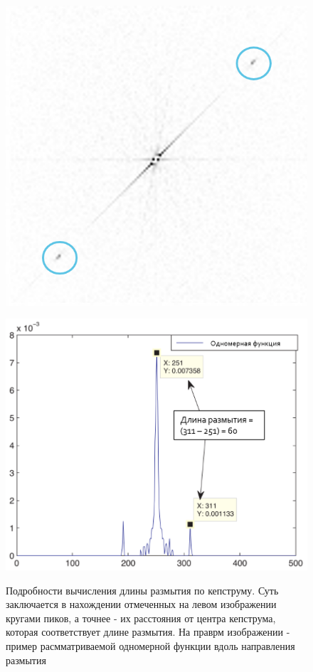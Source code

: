 \begin{figure}[H]
\begin{minipage}[h]{0.45\linewidth}
\includegraphics[width=1\linewidth, right]{pics/len/cep_inverted.png} \\ 
\end{minipage}
\hfill
\begin{minipage}[h]{0.45\linewidth}
\includegraphics[width=1\linewidth, left]{pics/len/oned.PNG} \\ 
\end{minipage}
 
\caption{Подробности вычисления длины размытия по кепструму. Суть заключается в нахождении отмеченных на левом изображении кругами пиков, а точнее - их расстояния от центра кепструма, которая соответствует длине размытия. На праврм изображении - пример расмматриваемой одномерной функции вдоль направления размытия}
\label{ris:len_est_ex}
\end{figure}


